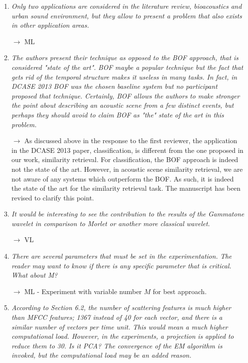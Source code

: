 \documentclass[10pt]{article}
\begin{document}
\begin{enumerate}

\item \emph{Only two applications are considered in the literature review, bioacoustics and urban sound environment, but they allow to present a problem that also exists in other application areas.}

$\rightarrow$ ML

\item \emph{The authors present their technique as opposed to the BOF approach, that is considered "state of the art". BOF maybe a popular technique but the fact that gets rid of the temporal structure makes it useless in many tasks. In fact, in DCASE 2013 BOF was the chosen baseline system but no participant proposed that technique. Certainly, BOF allows the authors to make stronger the point about describing an acoustic scene from a few distinct events, but perhaps they should avoid to claim BOF as "the" state of the art in this problem.}

$\rightarrow$
As discussed above in the response to the first reviewer, the application in the DCASE 2013 paper, classification, is different from the one proposed in our work, similarity retrieval. For classification, the BOF approach is indeed not the state of the art. However, in acoustic scene similarity retrieval, we are not aware of any systems which outperform the BOF. As such, it is indeed the state of the art for the similarity retrieval task. The manuscript has been revised to clarify this point.

\item \emph{It would be interesting to see the contribution to the results of the Gammatone wavelet in comparison to Morlet or another more classical wavelet.}

$\rightarrow$ VL

\item \emph{There are several parameters that must be set in the experimentation. The reader may want to know if there is any specific parameter that is critical. What about M?}

$\rightarrow$ ML - Experiment with variable number $M$ for best approach.

\item \emph{According to Section 6.2, the number of scattering features is much higher than MFCC features; 1367 instead of 40 for each vector, and there is a similar number of vectors per time unit. This would mean a much higher computational load. However, in the experiments, a projection is applied to reduce them to 30. Is it PCA? The convergence of the EM  algorithm is invoked, but the computational load may be an added reason.}


\end{enumerate}
\end{document}
